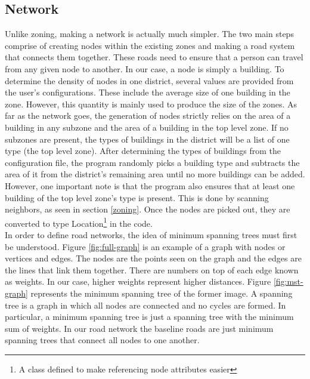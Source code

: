 \documentclass[11pt]{article}
\begin{document}
\begin{multicols}{2}
    \subsection{Network} \label{network}
    
    \quad Unlike zoning, making a network is actually much simpler. The two main steps comprise of creating nodes within the existing zones and making a road system that connects them together. These roads need to ensure that a person can travel from any given node to another. In our case, a node is simply a building. To determine the density of nodes in one district, several values are provided from the user's configurations. These include the average size of one building in the zone. However, this quantity is mainly used to produce the size of the zones. As far as the network goes, the generation of nodes strictly relies on the area of a building in any subzone and the area of a building in the top level zone. If no subzones are present, the types of buildings in the district will be a list of one type (the top level zone). After determining the types of buildings from the configuration file, the program randomly picks a building type and subtracts the area of it from the district's remaining area until no more buildings can be added. However, one important note is that the program also ensures that at least one building of the top level zone's type is present. This is done by scanning neighbors, as seen in section \ref{zoning}. Once the nodes are picked out, they are converted to type Location\footnote{A class defined to make referencing node attributes easier} in the code.\\

    \quad In order to define road networks, the idea of minimum spanning trees must first be understood. Figure \ref{fig:full-graph} is an example of a graph with nodes or vertices and edges. The nodes are the points seen on the graph and the edges are the lines that link them together. There are numbers on top of each edge known as weights. In our case, higher weights represent higher distances. Figure \ref{fig:mst-graph} represents the minimum spanning tree of the former image. A spanning tree is a graph in which all nodes are connected and no cycles are formed. In particular, a minimum spanning tree is just a spanning tree with the minimum sum of weights. In our road network the baseline roads are just minimum spanning trees that connect all nodes to one another.


\end{multicols}
\end{document}
